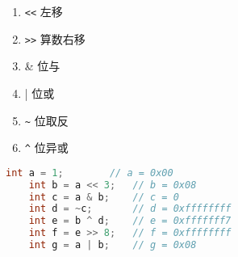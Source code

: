 \begin{enumerate}
	\item \lstinline|<<| 左移
	\item \lstinline|>>| 算数右移
	\item \& 位与
	\item | 位或
	\item \lstinline|~| 位取反
    \item \lstinline|^| 位异或
\end{enumerate}

\begin{lstlisting}[language = c]
    int a = 1;        // a = 0x00
    int b = a << 3;   // b = 0x08
    int c = a & b;    // c = 0
    int d = ~c;       // d = 0xffffffff
    int e = b ^ d;    // e = 0xfffffff7
    int f = e >> 8;   // f = 0xffffffff
    int g = a | b;    // g = 0x08
\end{lstlisting}

